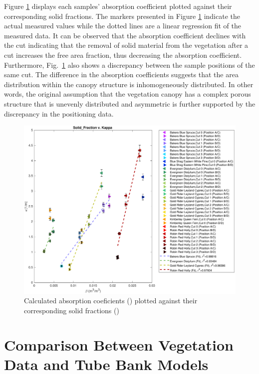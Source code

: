 \documentclass[12pt]{article}
\begin{document}
Figure \ref{fig:betavkappa} displays each samples' absorption coefficient plotted against their corresponding solid fractions. The markers presented in Figure \ref{fig:betavkappa} indicate the actual measured values while the dotted lines are a linear regression fit of the measured data. It can be observed that the absorption coefficient declines with the cut indicating that the removal of solid material from the vegetation after a cut increases the free area fraction, thus decreasing the absorption coefficient. Furthermore, Fig.~\ref{fig:betavkappa} also shows a discrepancy between the sample positions of the same cut. The difference in the absorption coefficients suggests that the area distribution within the canopy structure is inhomogeneously distributed. In other words, the original assumption that the vegetation canopy has a complex porous structure that is unevenly distributed and asymmetric is further supported by the discrepancy in the positioning data.

\begin{figure}[h]
	\centering 	\includegraphics[width=0.8\linewidth]{Solid_FractionvKappa(Ave).pdf}
	\caption{Calculated absorption coeficients (\textkappa) plotted against their corresponding solid fractions (\textbeta) }
	\label{fig:betavkappa}
\end{figure}
\pagebreak

\section{Comparison Between Vegetation Data and Tube Bank Models}
\label{sec:comp}
\end{document}
